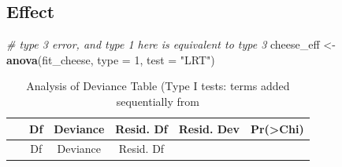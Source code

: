 \documentclass[]{book}
\newenvironment{Shaded}{\begin{snugshade}}{\end{snugshade}}
\newcommand{\CommentTok}[1]{\textcolor[rgb]{0.56,0.35,0.01}{\textit{#1}}}
\newcommand{\DataTypeTok}[1]{\textcolor[rgb]{0.13,0.29,0.53}{#1}}
\newcommand{\DecValTok}[1]{\textcolor[rgb]{0.00,0.00,0.81}{#1}}
\newcommand{\KeywordTok}[1]{\textcolor[rgb]{0.13,0.29,0.53}{\textbf{#1}}}
\newcommand{\NormalTok}[1]{#1}
\newcommand{\StringTok}[1]{\textcolor[rgb]{0.31,0.60,0.02}{#1}}
\begin{document}
\hypertarget{effect}{%
\subsection{Effect}\label{effect}}

\begin{Shaded}
\begin{Highlighting}[]
\CommentTok{# type 3 error, and type 1 here is equivalent to type 3}
\NormalTok{cheese_eff <-}\StringTok{ }\KeywordTok{anova}\NormalTok{(fit_cheese, }\DataTypeTok{type =} \DecValTok{1}\NormalTok{, }\DataTypeTok{test =} \StringTok{"LRT"}\NormalTok{)}
\end{Highlighting}
\end{Shaded}

\begin{longtable}[]{@{}cccccc@{}}
\caption{Analysis of Deviance Table (Type I tests: terms added sequentially from}\tabularnewline
\toprule
\begin{minipage}[b]{0.15\columnwidth}\centering
~\strut
\end{minipage} & \begin{minipage}[b]{0.06\columnwidth}\centering
Df\strut
\end{minipage} & \begin{minipage}[b]{0.13\columnwidth}\centering
Deviance\strut
\end{minipage} & \begin{minipage}[b]{0.14\columnwidth}\centering
Resid. Df\strut
\end{minipage} & \begin{minipage}[b]{0.15\columnwidth}\centering
Resid. Dev\strut
\end{minipage} & \begin{minipage}[b]{0.15\columnwidth}\centering
Pr(\textgreater{}Chi)\strut
\end{minipage}\tabularnewline
\midrule
\endfirsthead
\toprule
\begin{minipage}[b]{0.15\columnwidth}\centering
~\strut
\end{minipage} & \begin{minipage}[b]{0.06\columnwidth}\centering
Df\strut
\end{minipage} & \begin{minipage}[b]{0.13\columnwidth}\centering
Deviance\strut
\end{minipage} & \begin{minipage}[b]{0.14\columnwidth}\centering
Resid. Df\strut
\end{minipage} & \begin{minipage}[b]{0.15\columnwidth}\centering

\end{minipage}
\end{longtable}
\end{document}
